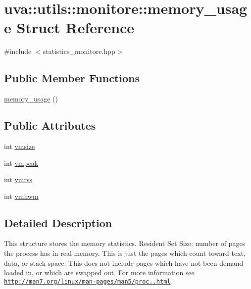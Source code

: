 \hypertarget{structuva_1_1utils_1_1monitore_1_1memory__usage}{}\section{uva\+:\+:utils\+:\+:monitore\+:\+:memory\+\_\+usage Struct Reference}
\label{structuva_1_1utils_1_1monitore_1_1memory__usage}


{\ttfamily \#include $<$statistics\+\_\+monitore.\+hpp$>$}

\subsection*{Public Member Functions}
\begin{DoxyCompactItemize}
\item 
\hyperlink{structuva_1_1utils_1_1monitore_1_1memory__usage_a60e2c8c8eb6d3505c7b0aae64fd335bd}{memory\+\_\+usage} ()
\end{DoxyCompactItemize}
\subsection*{Public Attributes}
\begin{DoxyCompactItemize}
\item 
int \hyperlink{structuva_1_1utils_1_1monitore_1_1memory__usage_a2585fdae114453629672e93a8eb8142c}{vmsize}
\item 
int \hyperlink{structuva_1_1utils_1_1monitore_1_1memory__usage_a2e46654655bb58a02ec3f7d028dac05a}{vmpeak}
\item 
int \hyperlink{structuva_1_1utils_1_1monitore_1_1memory__usage_ae885e502d2a99d1cce2f80a36a612dff}{vmrss}
\item 
int \hyperlink{structuva_1_1utils_1_1monitore_1_1memory__usage_a087f64b65c1db1feb18c75e763175ff6}{vmhwm}
\end{DoxyCompactItemize}


\subsection{Detailed Description}
This structure stores the memory statistics. Resident Set Size\+: number of pages the process has in real memory. This is just the pages which count toward text, data, or stack space. This does not include pages which have not been demand-\/loaded in, or which are swapped out. For more information see \href{http://man7.org/linux/man-pages/man5/proc.5.html}{\tt http\+://man7.\+org/linux/man-\/pages/man5/proc..\+html} 

